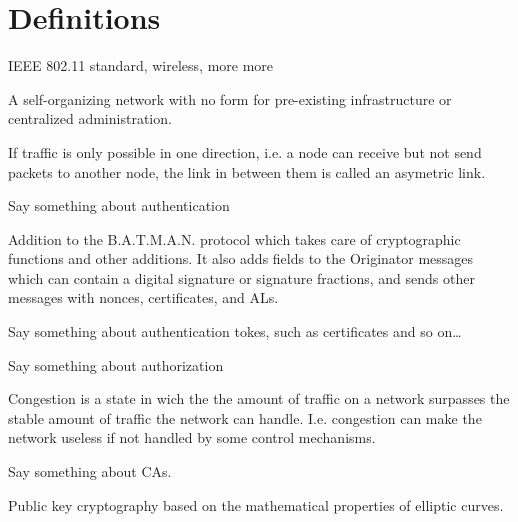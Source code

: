 \chapter*{Definitions}


\begin{acronym}

	IEEE 802.11 standard, wireless, more more

	A self-organizing network with no form for pre-existing infrastructure or
	centralized administration.

	If traffic is only possible in one direction, i.e. a node can receive but not
	send packets to another node, the link in between them is called an asymetric
	link.


	Say something about authentication

	Addition to the B.A.T.M.A.N. protocol which takes care of cryptographic
	functions and other additions. It also adds fields to the Originator messages
	which can contain a digital signature or signature fractions, and sends other
	messages with nonces, certificates, and ALs.

	Say something about authentication tokes, such as certificates and so on\ldots

	Say something about authorization

	Congestion is a state in wich the the amount of traffic on a network surpasses
	the stable amount of traffic the network can handle. I.e. congestion can make
	the network useless if not handled by some control mechanisms.
	
	Say something about CAs.


	Public key cryptography based on the mathematical properties of elliptic
	curves.


\end{acronym}
